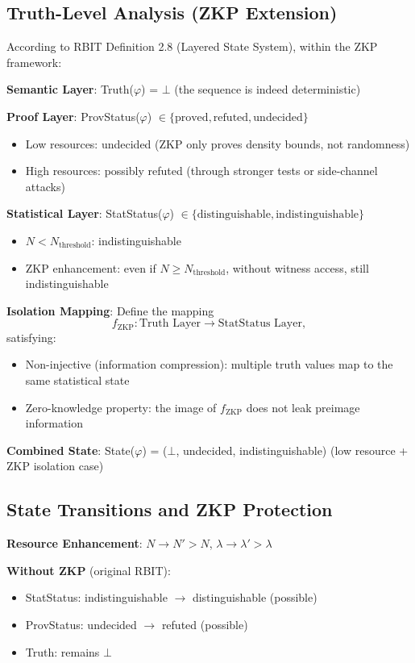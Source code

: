 \documentclass[12pt]{article}
\theoremstyle{plain}
\theoremstyle{definition}
\begin{document}
\subsection{Truth-Level Analysis (ZKP Extension)}

According to RBIT Definition 2.8 (Layered State System), within the ZKP framework:

\textbf{Semantic Layer}: Truth($\varphi$) = $\bot$ (the sequence is indeed deterministic)

\textbf{Proof Layer}: ProvStatus($\varphi$) $\in \{\text{proved}, \text{refuted}, \text{undecided}\}$
\begin{itemize}
\item Low resources: undecided (ZKP only proves density bounds, not randomness)
\item High resources: possibly refuted (through stronger tests or side-channel attacks)
\end{itemize}

\textbf{Statistical Layer}: StatStatus($\varphi$) $\in \{\text{distinguishable}, \text{indistinguishable}\}$
\begin{itemize}
\item $N < N_{\text{threshold}}$: indistinguishable
\item ZKP enhancement: even if $N \ge N_{\text{threshold}}$, without witness access, still indistinguishable
\end{itemize}

\textbf{Isolation Mapping}: Define the mapping
\[
f_{\text{ZKP}}: \text{Truth Layer} \to \text{StatStatus Layer},
\]
satisfying:
\begin{itemize}
\item Non-injective (information compression): multiple truth values map to the same statistical state
\item Zero-knowledge property: the image of $f_{\text{ZKP}}$ does not leak preimage information
\end{itemize}

\textbf{Combined State}: State($\varphi$) = ($\bot$, undecided, indistinguishable) (low resource + ZKP isolation case)

\subsection{State Transitions and ZKP Protection}

\textbf{Resource Enhancement}: $N \to N' > N$, $\lambda \to \lambda' > \lambda$

\textbf{Without ZKP} (original RBIT):
\begin{itemize}
\item StatStatus: indistinguishable $\to$ distinguishable (possible)
\item ProvStatus: undecided $\to$ refuted (possible)
\item Truth: remains $\bot$
\end{itemize}
\end{document}
